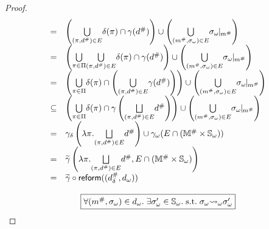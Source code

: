 \begin{proof}
\[\begin{array}{cl}
      =& \left( \underset{(\view, \abselem) \in E}{\bigcup} \viewmap(\view) \cap
      \gamma(\abselem) \right) \cup \left( \underset{(\absimap, \symbst) \in
      E}{\bigcup} \instant{\symbst}{\absimap} \right)\\

      =& \left( \underset{\view \in \viewset}{\bigcup} { \underset{(\view,
      \abselem) \in E}{\bigcup} \viewmap(\view) \cap \gamma(\abselem) } \right)
      \cup \left( \underset{(\absimap, \symbst) \in E}{\bigcup}
      \instant{\symbst}{\absimap} \right)\\

      =& \left( \underset{\view \in \viewset}{\bigcup} {\viewmap(\view) \cap
        \left(\underset{(\view, \abselem) \in
      E}{\bigcup}{\gamma(\abselem)}\right)} \right) \cup \left(
      \underset{(\absimap, \symbst) \in E}{\bigcup} \instant{\symbst}{\absimap}
      \right)\\

      \subseteq& \left( \underset{\view \in \viewset}{\bigcup} {\viewmap(\view)
        \cap \gamma\left( \underset{(\view, \abselem) \in E}{\bigjoin}\abselem
      \right)} \right) \cup \left( \underset{(\absimap, \symbst) \in E}{\bigcup}
      \instant{\symbst}{\absimap} \right)\\

      =& \sgamma\left( \lambda \view. \underset{(\view, \abselem) \in
      E}{\bigjoin}\abselem \right) \cup \symbgamma(E \cap (\absimapset \times
      \symbstset))\\

      =& \combgamma\left( \lambda \view. \underset{(\view, \abselem) \in
      E}{\bigjoin}\abselem, E \cap (\absimapset \times \symbstset) \right)\\

      =& \combgamma \circ \reform((\sabselem, \symbelem))
    \end{array}
  \]
  \[\]
  \[
    \fbox{$\forall ({m}^{\#}, {\sigma}_\omega) \in {{d}_\omega}. \; \exists {\sigma}_\omega' \in
    {\mathbb{S}}_\omega.  \; \text{s.t.} \; {\sigma}_\omega {\leadsto}_\omega {\sigma}_\omega'$}
  \]


\end{proof}
